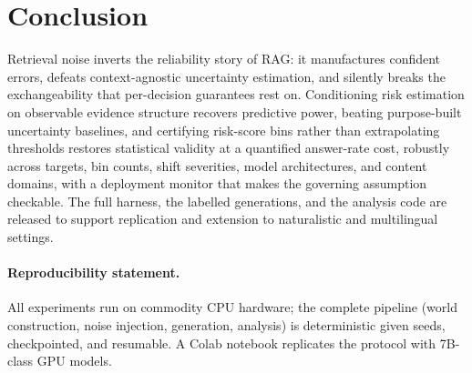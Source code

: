\documentclass[11pt]{article}
\begin{document}
\section{Conclusion}
Retrieval noise inverts the reliability story of RAG: it manufactures
confident errors, defeats context-agnostic uncertainty estimation, and
silently breaks the exchangeability that per-decision guarantees rest
on. Conditioning risk estimation on observable evidence structure
recovers predictive power, beating purpose-built uncertainty baselines,
and certifying risk-score bins rather than extrapolating thresholds
restores statistical validity at a quantified answer-rate cost, robustly
across targets, bin counts, shift severities, model architectures, and
content domains, with a deployment monitor that makes the governing
assumption checkable. The full harness, the labelled generations, and
the analysis code are released to support replication and extension to
naturalistic and multilingual settings.

\paragraph{Reproducibility statement.}
All experiments run on commodity CPU hardware; the complete pipeline
(world construction, noise injection, generation, analysis) is
deterministic given seeds, checkpointed, and resumable. A Colab
notebook replicates the protocol with 7B-class GPU models.

\appendix
\end{document}
